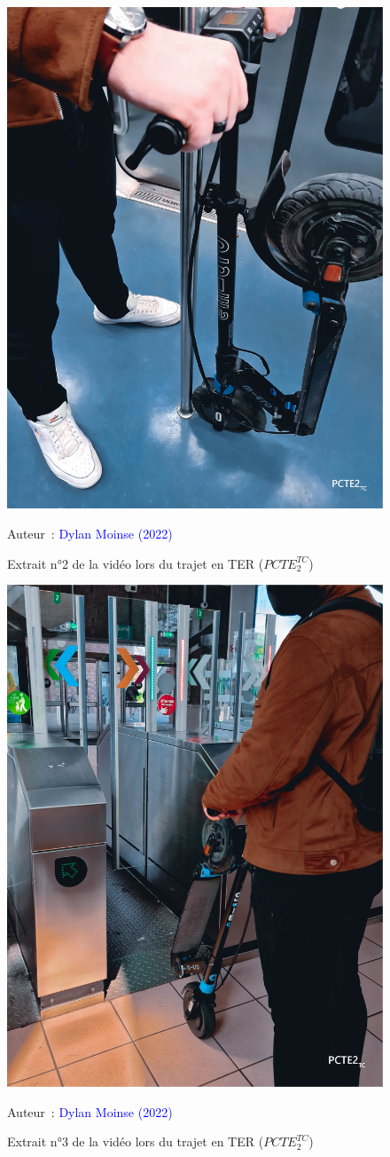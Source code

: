     \begin{figure}[h!]\vspace*{4pt}
        \caption*{Extrait n°2 de la vidéo lors du trajet en TER (\(PCTE^{TC}_{2}\))}
        \centerline{\includegraphics[width=0.5\columnwidth]{src/Figures/Annexes/Extrait_Video_PCTE2_TC_2.jpg}}
        \vspace{5pt}
        \begin{flushright}\scriptsize{
        Auteur~: \textcolor{blue}{Dylan Moinse (2022)}
        }\end{flushright}
    \end{figure}
    
    \begin{figure}[h!]\vspace*{4pt}
        \caption*{Extrait n°3 de la vidéo lors du trajet en TER (\(PCTE^{TC}_{2}\))}
        \centerline{\includegraphics[width=0.5\columnwidth]{src/Figures/Annexes/Extrait_Video_PCTE2_TC_3.jpg}}
        \vspace{5pt}
        \begin{flushright}\scriptsize{
        Auteur~: \textcolor{blue}{Dylan Moinse (2022)}
        }\end{flushright}
    \end{figure}

